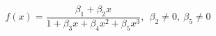 

\[
f(x) = \frac{\beta_1 + \beta_2x}{1 + \beta_3x + \beta_4x^2 + \beta_5x^3}, \ \ \beta_2 \neq 0, \ \beta_5 \neq 0
\]


